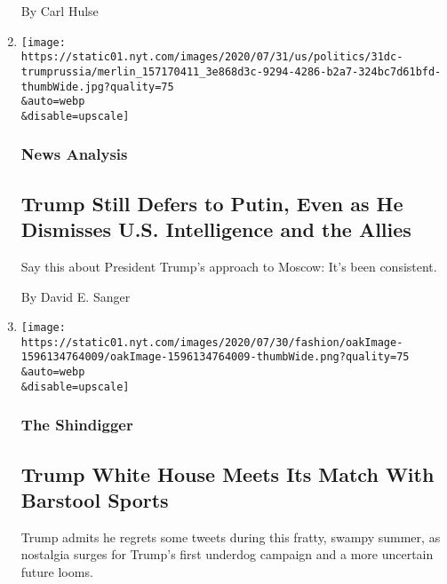 \begin{enumerate}
  By Carl Hulse
\item
  \href{/2020/07/31/us/politics/trump-russia-nato-bounties.html}{}

  \texttt{[image: https://static01.nyt.com/images/2020/07/31/us/politics/31dc-trumprussia/merlin\_157170411\_3e868d3c-9294-4286-b2a7-324bc7d61bfd-thumbWide.jpg?quality=75\\\&auto=webp\\\&disable=upscale]}

  \hypertarget{news-analysis-1}{%
  \subsubsection{News Analysis}\label{news-analysis-1}}

  \hypertarget{trump-still-defers-to-putin-even-as-he-dismisses-us-intelligence-and-the-allies}{%
  \subsection{Trump Still Defers to Putin, Even as He Dismisses U.S.
  Intelligence and the
  Allies}\label{trump-still-defers-to-putin-even-as-he-dismisses-us-intelligence-and-the-allies}}

  Say this about President Trump's approach to Moscow: It's been
  consistent.

  By David E. Sanger
\item
  \href{/2020/07/31/style/trump-twitter-barstool-sports.html}{}

  \texttt{[image: https://static01.nyt.com/images/2020/07/30/fashion/oakImage-1596134764009/oakImage-1596134764009-thumbWide.png?quality=75\\\&auto=webp\\\&disable=upscale]}

  \hypertarget{the-shindigger}{%
  \subsubsection{The Shindigger}\label{the-shindigger}}

  \hypertarget{trump-white-house-meets-its-match-with-barstool-sports}{%
  \subsection{Trump White House Meets Its Match With Barstool
  Sports}\label{trump-white-house-meets-its-match-with-barstool-sports}}

  Trump admits he regrets some tweets during this fratty, swampy summer,
  as nostalgia surges for Trump's first underdog campaign and a more
  uncertain future looms.


\end{enumerate}
